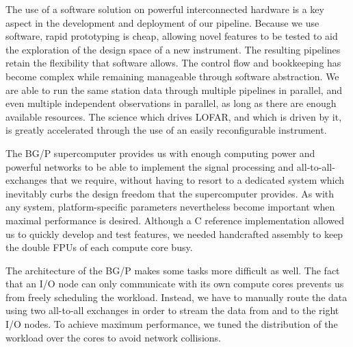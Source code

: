 \documentclass{llncs}
\begin{document}
The use of a software solution on powerful interconnected hardware is a key aspect in the development and deployment of our pipeline. Because we use software, rapid prototyping is cheap, allowing novel features to be tested to aid the exploration of the design space of a new instrument. The resulting pipelines retain the flexibility that software allows. The control flow and bookkeeping has become complex while remaining manageable through software abstraction. We are able to run the same station data through multiple pipelines in parallel, and even multiple independent observations in parallel, as long as there are enough available resources. The science which drives LOFAR, and which is driven by it, is greatly accelerated through the use of an easily reconfigurable instrument.

The BG/P supercomputer provides us with enough computing power and powerful networks to be able to implement the signal processing and all-to-all-exchanges that we require, without having to resort to a dedicated system which inevitably curbs the design freedom that the supercomputer provides. As with any system, platform-specific parameters nevertheless become important when maximal performance is desired. Although a C reference implementation allowed us to quickly develop and test features, we needed handcrafted assembly to keep the double FPUs of each compute core busy.

The architecture of the BG/P makes some tasks more difficult as well. The fact that an I/O node can only communicate with its own compute cores prevents us from freely scheduling the workload. Instead, we have to manually route the data using two all-to-all exchanges in order to stream the data from and to the right I/O nodes. To achieve maximum performance, we tuned the distribution of the workload over the cores to avoid network collisions.



\end{document}
